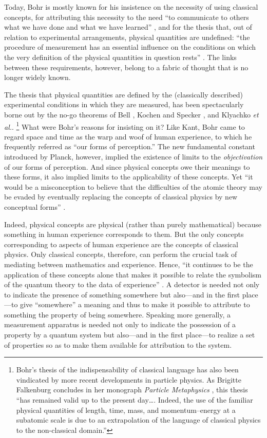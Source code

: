 \documentclass[12pt]{article}
\begin{document}
Today, Bohr is mostly known for his insistence on the necessity of using classical concepts, for attributing this necessity to the need  ``to communicate to others what we have done and what we have learned'' \cite{Bohr-EAPHK,Bohr-APHK}, and for the thesis that, out of relation to experimental arrangements, physical quantities are undefined: ``the procedure of measurement has an essential influence on the conditions on which the very definition of the physical quantities in question rests'' \cite{BohrQMPR}. The links between these requirements, however, belong to a fabric of thought that is no longer widely known.

The thesis that physical quantities are defined by the (classically described) experimental conditions in which they are measured, has been spectacularly borne out by the {no-go theorems} of Bell \cite{Bell64}, Kochen and Specker \cite{KochenSpecker}, and Klyachko \textit{et al.}\cite{Klyaetal2008}.%
\footnote{Bohr's thesis of the indispensability of classical language has also been vindicated by more recent developments in particle physics. As Brigitte Falkenburg concludes in her monograph \emph{Particle Metaphysics} \cite{Falk2007}, this thesis ``has remained valid up to the present day\dots. Indeed, the use of the familiar physical quantities of length, time, mass, and momentum--energy at a subatomic scale is due to an extrapolation of the language of classical physics to the non-classical domain.''}
What were Bohr's reasons for insisting on it? Like Kant, Bohr came to regard space and time as the warp and woof of human experience, to which he frequently referred as ``our forms of perception.'' The new fundamental constant introduced by Planck, however, implied the existence of limits to the \emph{objectivation} of our forms of perception. And since physical concepts owe their meanings to these forms, it also implied limits to the applicability of these concepts. Yet ``it would be a misconception to believe that the difficulties of the atomic theory may be evaded by eventually replacing the concepts of classical physics by new conceptual forms'' \cite{BohrATDN}.

Indeed, physical concepts are physical (rather than purely mathematical) because something in human experience corresponds to them. But the only concepts corresponding to aspects of human experience are the concepts of classical physics. Only classical concepts, therefore, can perform the crucial task of mediating between mathematics and experience. Hence, ``it continues to be the application of these concepts alone that makes it possible to relate the symbolism of the quantum theory to the data of experience'' \cite{BohrATDN}. A detector is needed not only to indicate the presence of something somewhere but also---and in the first place---to give ``somewhere'' a meaning and thus to make it possible to attribute to something the property of being somewhere. Speaking more generally, a measurement apparatus is needed not only to indicate the possession of a property by a quantum system but also---and in the first place---to realize a set of properties so as to make them available for attribution to the system.
\end{document}
